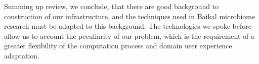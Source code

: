 \documentclass[a4paper]{jpconf}
\begin{document}
Summing up review, we conclude, that there are good background to construction of our infrastructure, and the techniques used in Baikal microbiome research must be adapted to this background. The technologies we spoke before allow us to account the peculiarity of our problem, which is the requirement of a greater flexibility of the computation process and domain user experience adaptation.









\end{document}
